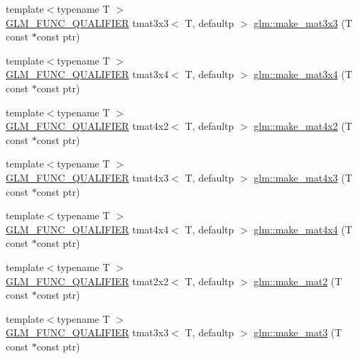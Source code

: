 \begin{DoxyCompactItemize}
\item 
{\footnotesize template$<$typename T $>$ }\\\mbox{\hyperlink{setup_8hpp_a33fdea6f91c5f834105f7415e2a64407}{G\+L\+M\+\_\+\+F\+U\+N\+C\+\_\+\+Q\+U\+A\+L\+I\+F\+I\+ER}} tmat3x3$<$ T, defaultp $>$ \mbox{\hyperlink{group__gtc__type__ptr_ga3cbe7adf857c867cee77eae4617abadd}{glm\+::make\+\_\+mat3x3}} (T const $\ast$const ptr)
\item 
{\footnotesize template$<$typename T $>$ }\\\mbox{\hyperlink{setup_8hpp_a33fdea6f91c5f834105f7415e2a64407}{G\+L\+M\+\_\+\+F\+U\+N\+C\+\_\+\+Q\+U\+A\+L\+I\+F\+I\+ER}} tmat3x4$<$ T, defaultp $>$ \mbox{\hyperlink{group__gtc__type__ptr_gac083edd180ab4d4b817acc60c516209b}{glm\+::make\+\_\+mat3x4}} (T const $\ast$const ptr)
\item 
{\footnotesize template$<$typename T $>$ }\\\mbox{\hyperlink{setup_8hpp_a33fdea6f91c5f834105f7415e2a64407}{G\+L\+M\+\_\+\+F\+U\+N\+C\+\_\+\+Q\+U\+A\+L\+I\+F\+I\+ER}} tmat4x2$<$ T, defaultp $>$ \mbox{\hyperlink{group__gtc__type__ptr_ga967a5b934e67ff9a6d1d0d27a377a264}{glm\+::make\+\_\+mat4x2}} (T const $\ast$const ptr)
\item 
{\footnotesize template$<$typename T $>$ }\\\mbox{\hyperlink{setup_8hpp_a33fdea6f91c5f834105f7415e2a64407}{G\+L\+M\+\_\+\+F\+U\+N\+C\+\_\+\+Q\+U\+A\+L\+I\+F\+I\+ER}} tmat4x3$<$ T, defaultp $>$ \mbox{\hyperlink{group__gtc__type__ptr_ga4d42daced532b33cc672280e48670a51}{glm\+::make\+\_\+mat4x3}} (T const $\ast$const ptr)
\item 
{\footnotesize template$<$typename T $>$ }\\\mbox{\hyperlink{setup_8hpp_a33fdea6f91c5f834105f7415e2a64407}{G\+L\+M\+\_\+\+F\+U\+N\+C\+\_\+\+Q\+U\+A\+L\+I\+F\+I\+ER}} tmat4x4$<$ T, defaultp $>$ \mbox{\hyperlink{group__gtc__type__ptr_gaf605a5f5e2ff594e8d404b2855b09541}{glm\+::make\+\_\+mat4x4}} (T const $\ast$const ptr)
\item 
{\footnotesize template$<$typename T $>$ }\\\mbox{\hyperlink{setup_8hpp_a33fdea6f91c5f834105f7415e2a64407}{G\+L\+M\+\_\+\+F\+U\+N\+C\+\_\+\+Q\+U\+A\+L\+I\+F\+I\+ER}} tmat2x2$<$ T, defaultp $>$ \mbox{\hyperlink{group__gtc__type__ptr_ga52a16e333fef7e33ca740779482a8693}{glm\+::make\+\_\+mat2}} (T const $\ast$const ptr)
\item 
{\footnotesize template$<$typename T $>$ }\\\mbox{\hyperlink{setup_8hpp_a33fdea6f91c5f834105f7415e2a64407}{G\+L\+M\+\_\+\+F\+U\+N\+C\+\_\+\+Q\+U\+A\+L\+I\+F\+I\+ER}} tmat3x3$<$ T, defaultp $>$ \mbox{\hyperlink{group__gtc__type__ptr_gac2bc10c519ffc8db9e24f325f23787ea}{glm\+::make\+\_\+mat3}} (T const $\ast$const ptr)

\end{DoxyCompactItemize}
